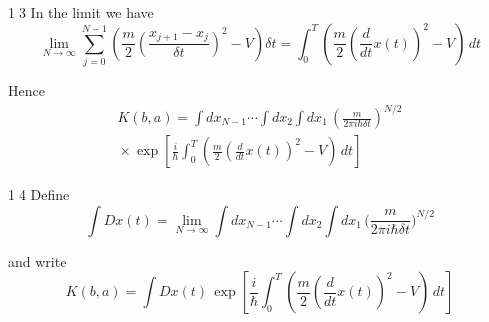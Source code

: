 \documentclass[12pt]{article}
\begin{document}
\textcircled{\scriptsize13}
In the limit we have
\begin{equation*}
\lim_{N\rightarrow\infty}
\sum_{j=0}^{N-1}
\left(
\frac{m}{2}\left(\frac{x_{j+1}-x_j}{\delta t}\right)^2-V
\right)\delta t
=
\int_0^T
\left(
\frac{m}{2}\left(\frac{d}{dt}x(t)\right)^2-V
\right)\,dt
\end{equation*}

Hence
\begin{multline*}
K(b,a)=\int dx_{N-1}\cdots\int dx_2\int dx_1\,
\left(\frac{m}{2\pi i\hbar\delta t}\right)^{N/2}
\\
{}\times
\exp\left[
\frac{i}{\hbar}
\int_0^T
\left(
\frac{m}{2}\left(\frac{d}{dt}x(t)\right)^2-V
\right)
\,dt
\right]
\end{multline*}

\textcircled{\scriptsize14}
Define
\begin{equation*}
\int Dx(t)=\lim_{N\rightarrow\infty}
\int dx_{N-1}\cdots\int dx_2\int dx_1\,
\biggl(\frac{m}{2\pi i\hbar\delta t}\biggr)^{N/2}
\end{equation*}

and write
\begin{equation*}
K(b,a)=\int Dx(t)\,
\exp\left[
\frac{i}{\hbar}
\int_0^T
\left(
\frac{m}{2}\left(\frac{d}{dt}x(t)\right)^2-V
\right)
\,dt
\right]
\end{equation*}
\end{document}
